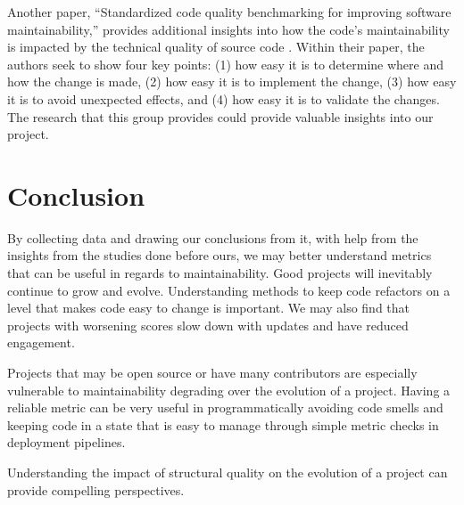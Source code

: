 \documentclass[conference]{IEEEtran}
\begin{document}
Another paper, ``Standardized code quality benchmarking for improving software maintainability,'' provides additional insights into how the code's maintainability is impacted by the technical quality of source code \cite{baggen:2012}. Within their paper, the authors seek to show four key points: (1) how easy it is to determine where and how the change is made, (2) how easy it is to implement the change, (3) how easy it is to avoid unexpected effects, and (4) how easy it is to validate the changes. The research that this group provides could provide valuable insights into our project.

\section{Conclusion}

By collecting data and drawing our conclusions from it, with help from the insights from the studies done before ours, we may better understand metrics that can be useful in regards to maintainability. Good projects will inevitably continue to grow and evolve. Understanding methods to keep code refactors on a level that makes code easy to change is important. We may also find that projects with worsening scores slow down with updates and have reduced engagement.

Projects that may be open source or have many contributors are especially vulnerable to maintainability degrading over the evolution of a project. Having a reliable metric can be very useful in programmatically avoiding code smells and keeping code in a state that is easy to manage through simple metric checks in deployment pipelines.

Understanding the impact of structural quality on the evolution of a project can provide compelling perspectives.

\newpage


\end{document}
